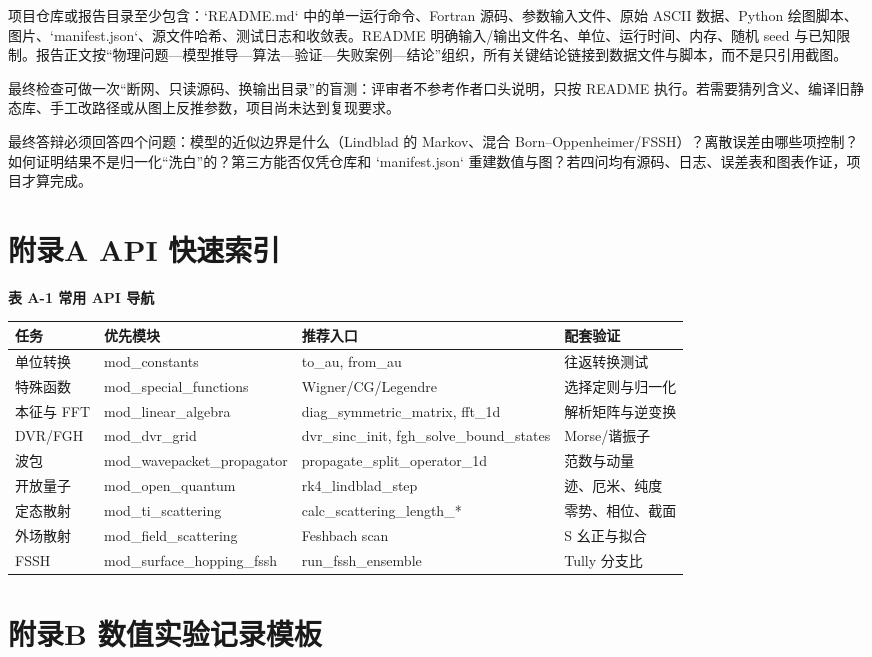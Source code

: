 \documentclass[UTF8,openany,11pt,fontset=fandol]{ctexbook}
\begin{document}
项目仓库或报告目录至少包含：`README.md` 中的单一运行命令、Fortran
源码、参数输入文件、原始 ASCII 数据、Python
绘图脚本、图片、`manifest.json`、源文件哈希、测试日志和收敛表。README
明确输入/输出文件名、单位、运行时间、内存、随机 seed
与已知限制。报告正文按``物理问题---模型推导---算法---验证---失败案例---结论''组织，所有关键结论链接到数据文件与脚本，而不是只引用截图。

最终检查可做一次``断网、只读源码、换输出目录''的盲测：评审者不参考作者口头说明，只按
README
执行。若需要猜列含义、编译旧静态库、手工改路径或从图上反推参数，项目尚未达到复现要求。

最终答辩必须回答四个问题：模型的近似边界是什么（Lindblad 的 Markov、混合
Born--Oppenheimer/FSSH）？离散误差由哪些项控制？如何证明结果不是归一化``洗白''的？第三方能否仅凭仓库和
`manifest.json`
重建数值与图？若四问均有源码、日志、误差表和图表作证，项目才算完成。

\chapter{附录A API 快速索引}\label{ux9644ux5f55a-api-ux5febux901fux7d22ux5f15}

\textbf{表 A-1 常用 API 导航}

\begin{longtable}[]{@{}llll@{}}
\toprule
\textbf{任务} & \textbf{优先模块} & \textbf{推荐入口} &
\textbf{配套验证}\tabularnewline
\midrule
\endhead
单位转换 & mod\_constants & to\_au, from\_au &
往返转换测试\tabularnewline
特殊函数 & mod\_special\_functions & Wigner/CG/Legendre &
选择定则与归一化\tabularnewline
本征与 FFT & mod\_linear\_algebra & diag\_symmetric\_matrix, fft\_1d &
解析矩阵与逆变换\tabularnewline
DVR/FGH & mod\_dvr\_grid & dvr\_sinc\_init, fgh\_solve\_bound\_states &
Morse/谐振子\tabularnewline
波包 & mod\_wavepacket\_propagator & propagate\_split\_operator\_1d &
范数与动量\tabularnewline
开放量子 & mod\_open\_quantum & rk4\_lindblad\_step &
迹、厄米、纯度\tabularnewline
定态散射 & mod\_ti\_scattering & calc\_scattering\_length\_* &
零势、相位、截面\tabularnewline
外场散射 & mod\_field\_scattering & Feshbach scan & S
幺正与拟合\tabularnewline
FSSH & mod\_surface\_hopping\_fssh & run\_fssh\_ensemble & Tully
分支比\tabularnewline
\bottomrule
\end{longtable}

\chapter{附录B 数值实验记录模板}\label{ux9644ux5f55b-ux6570ux503cux5b9eux9a8cux8bb0ux5f55ux6a21ux677f}
\end{document}
